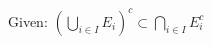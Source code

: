 \documentclass[preview]{standalone}
\begin{document}
\begin{center}
Given: $(\bigcup_{i \in I} E_i)^c \subset \bigcap_{i \in I} E_i^c$
\end{center}
\end{document}
